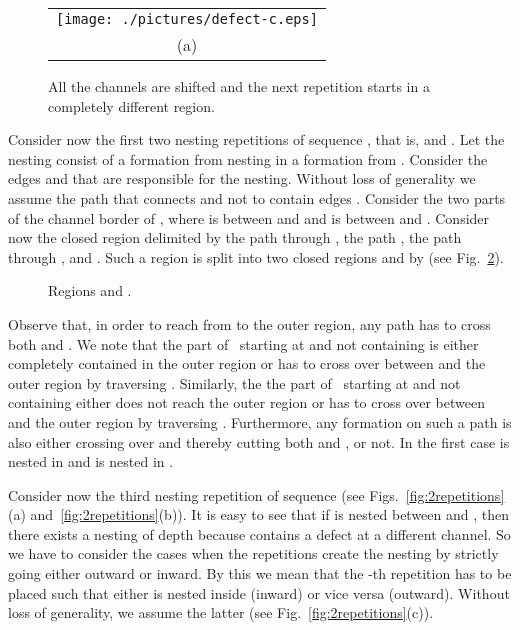 \documentclass[a4paper,10pt]{llncs}
\renewenvironment{proof}
{{\bf Proof:}}{\hspace*{\fill}\par\vspace{2mm}}
\renewcommand{\P}{\mbox{ }}
\begin{document}
\begin{proof}
\begin{figure}[ht]
\begin{center}
\begin{tabular}{c}
\mbox{\texttt{[image: ./pictures/defect-c.eps]}} \\
(a)\\
\end{tabular}
\caption{All the channels  are shifted and the next repetition starts in a completely different region.}
\label{fig:global-shift}
\end{center}
\end{figure}

Consider now the first two nesting repetitions of sequence , that is,  and . Let the nesting consist of a formation  from  nesting in a formation  from .
Consider the edges  and  that are responsible for the nesting.
Without loss of generality we assume the path  that connects  and  not to contain edges .
Consider the two parts  of the channel border of , where  is between  and  and  is between   and . Consider now the closed region delimited by the path through , the path , the path through , and . Such a region is split into two closed regions  and  by  (see Fig.~\ref{fig:nesting_formations}).

\begin{figure}[htb]
\caption{Regions  and .}\label{fig:nesting_formations}
\end{figure}

Observe that, in order to reach from  to the outer region, any path has to cross both  and .
We note that the part of \P starting at  and not containing  is either completely contained in the outer region or has to cross over between  and the outer region by traversing . Similarly, the
the part of \P starting at  and not containing  either does not reach the outer region or has to cross over between  and the outer region by traversing . Furthermore, any formation  on such a path is also either crossing over and thereby cutting both  and , or not. In the first case  is nested in  and  is nested in .

Consider now the third nesting repetition  of sequence  (see Figs.~\ref{fig:2repetitions}(a) and~\ref{fig:2repetitions}(b)).
It is easy to see that if  is nested between  and , then there exists a nesting of depth  because  contains a defect at a different channel. So we have to consider the cases when the repetitions create the nesting by strictly going either outward or inward. By this we mean that the -th repetition  has to be placed such that either  is nested inside  (inward) or vice versa (outward).
Without loss of generality, we assume the latter (see Fig.~\ref{fig:2repetitions}(c)).


\end{proof}
\end{document}
